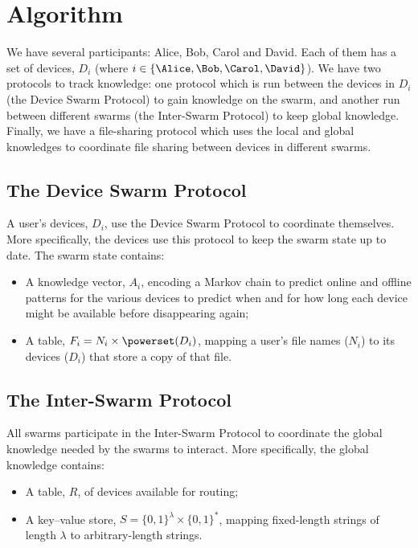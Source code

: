 \section{Algorithm}%
\label{Algorithm}


We have several participants: Alice, Bob, Carol and David.
Each of them has a set of devices, \(D_i\) (where \(i\in \{\Alice, \Bob, \Carol, 
  \David\}\)).
We have two protocols to track knowledge: one protocol which is run between the 
devices in \(D_i\) (the Device Swarm Protocol) to gain knowledge on the 
swarm, and another run between different swarms (the Inter-Swarm Protocol) to 
keep global knowledge.
Finally, we have a file-sharing protocol which uses the local and global 
knowledges to coordinate file sharing between devices in different swarms.

\subsection{The Device Swarm Protocol}%
\label{DeviceSwarmProtocol}

A user's devices, \(D_i\), use the Device Swarm Protocol to coordinate 
themselves.
More specifically, the devices use this protocol to keep the swarm state up to 
date.
The swarm state contains:
\begin{itemize}
  \item A knowledge vector, \(A_i\), encoding a Markov chain to predict online 
    and offline patterns for the various devices to predict when and for how 
    long each device might be available before disappearing again;
  \item A table, \(F_i = N_i\times \powerset(D_i)\), mapping a user's file names 
    (\(N_i\)) to its devices (\(D_i\)) that store a copy of that file.
\end{itemize}


\subsection{The Inter-Swarm Protocol}%
\label{InterSwarmProtocol}

All swarms participate in the Inter-Swarm Protocol to coordinate the global 
knowledge needed by the swarms to interact.
More specifically, the global knowledge contains:
\begin{itemize}
  \item A table, \(R\), of devices available for routing;
  \item A key--value store, \(S = \{0, 1\}^\lambda\times \{0, 1\}^*\), mapping 
    fixed-length strings of length \(\lambda\) to arbitrary-length strings.
\end{itemize}

